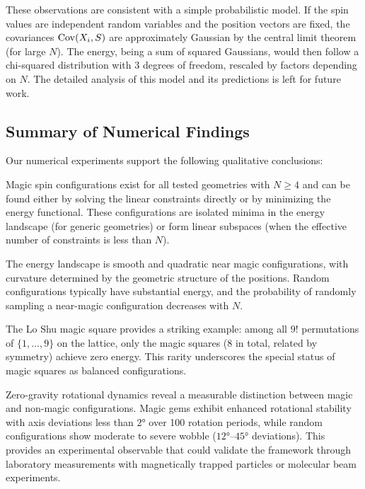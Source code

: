 These observations are consistent with a simple probabilistic model. If the spin values are independent random variables and the position vectors are fixed, the covariances $\operatorname{Cov}(X_i, S)$ are approximately Gaussian by the central limit theorem (for large $N$). The energy, being a sum of squared Gaussians, would then follow a chi-squared distribution with 3 degrees of freedom, rescaled by factors depending on $N$. The detailed analysis of this model and its predictions is left for future work.

\subsection{Summary of Numerical Findings}

Our numerical experiments support the following qualitative conclusions:

Magic spin configurations exist for all tested geometries with $N \geq 4$ and can be found either by solving the linear constraints directly or by minimizing the energy functional. These configurations are isolated minima in the energy landscape (for generic geometries) or form linear subspaces (when the effective number of constraints is less than $N$).

The energy landscape is smooth and quadratic near magic configurations, with curvature determined by the geometric structure of the positions. Random configurations typically have substantial energy, and the probability of randomly sampling a near-magic configuration decreases with $N$.

The Lo Shu magic square provides a striking example: among all $9!$ permutations of $\{1, \ldots, 9\}$ on the lattice, only the magic squares (8 in total, related by symmetry) achieve zero energy. This rarity underscores the special status of magic squares as balanced configurations.

Zero-gravity rotational dynamics reveal a measurable distinction between magic and non-magic configurations. Magic gems exhibit enhanced rotational stability with axis deviations less than $2°$ over 100 rotation periods, while random configurations show moderate to severe wobble ($12°$--$45°$ deviations). This provides an experimental observable that could validate the framework through laboratory measurements with magnetically trapped particles or molecular beam experiments.

